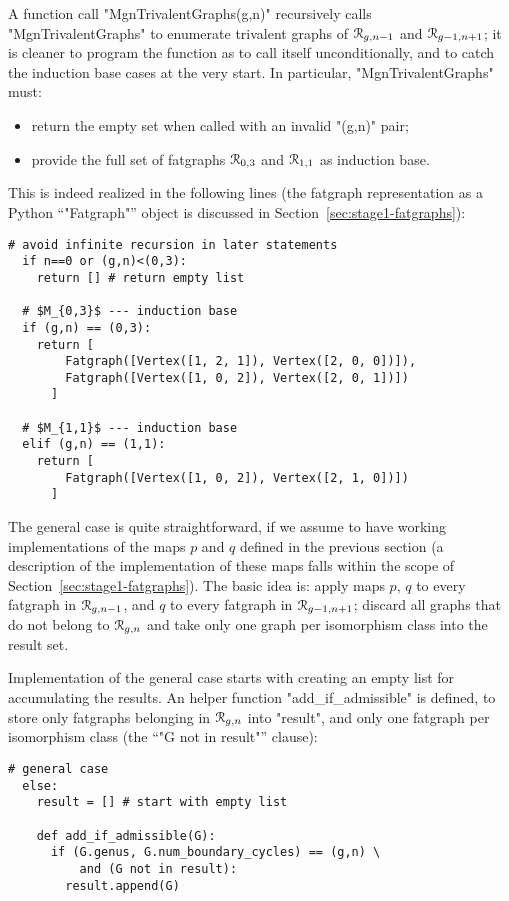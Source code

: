 A function call "MgnTrivalentGraphs(g,n)" recursively calls
"MgnTrivalentGraphs" to enumerate trivalent graphs of $\mathcal{R}_{g,n-1}$
and $\mathcal{R}_{g-1,n+1}$; it is cleaner to program the function as to call itself
unconditionally, and to catch the induction base cases at the very
start.  In particular, "MgnTrivalentGraphs" must:
\begin{itemize}
\item return the empty set when called with an invalid "(g,n)" pair;
\item provide the full set of fatgraphs $\mathcal{R}_{0,3}$ and $\mathcal{R}_{1,1}$ as
  induction base.
\end{itemize}
This is indeed realized in the following lines (the fatgraph
representation as a Python ``"Fatgraph"'' object is discussed in
Section~\ref{sec:stage1-fatgraphs}):
\begin{lstlisting}[name=MgnTrivalentGraphs,firstnumber=6]
  # avoid infinite recursion in later statements
  if n==0 or (g,n)<(0,3):
    return [] # return empty list

  # $M_{0,3}$ --- induction base
  if (g,n) == (0,3):
    return [ 
        Fatgraph([Vertex([1, 2, 1]), Vertex([2, 0, 0])]),
        Fatgraph([Vertex([1, 0, 2]), Vertex([2, 0, 1])]) 
      ]

  # $M_{1,1}$ --- induction base
  elif (g,n) == (1,1):
    return [ 
        Fatgraph([Vertex([1, 0, 2]), Vertex([2, 1, 0])]) 
      ]
\end{lstlisting}

The general case is quite straightforward, if we assume to have
working implementations of the maps $p$ and $q$ defined in the
previous section (a description of the implementation of these maps
falls within the scope of Section~\ref{sec:stage1-fatgraphs}).  The basic
idea is: apply maps $p$, $q$ to every fatgraph in $\mathcal{R}_{g,n-1}$, and
$q$ to every fatgraph in $\mathcal{R}_{g-1,n+1}$; discard all graphs that do
not belong to $\mathcal{R}_{g,n}$ and take only one graph per isomorphism class
into the result set.

Implementation of the general case starts with creating an empty list
for accumulating the results.  An helper function
"add_if_admissible" is defined, to store only fatgraphs belonging in
$\mathcal{R}_{g,n}$ into "result", and only one fatgraph per isomorphism
class (the ``"G not in result"'' clause):
\begin{lstlisting}[name=MgnTrivalentGraphs,firstnumber=22]
  # general case
  else:
    result = [] # start with empty list

    def add_if_admissible(G):
      if (G.genus, G.num_boundary_cycles) == (g,n) \
          and (G not in result):
        result.append(G)
      
\end{lstlisting}

